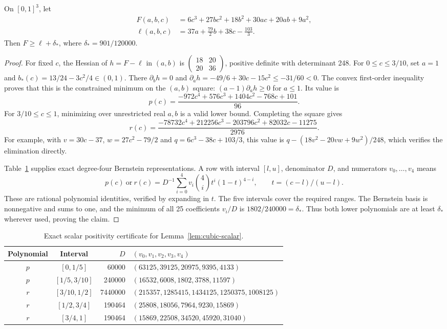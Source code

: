 \begin{lemma}
\label{lem:cubic-scalar}
On $[0,1]^3$, let
\begin{align*}
 F(a,b,c)&=6c^3+27bc^2+18b^2+30ac+20ab+9a^2,\\
 \ell(a,b,c)&=37a+\tfrac{79}{2}b+38c-\tfrac{103}{3}.
\end{align*}
Then $F\ge\ell+\delta_*$, where $\delta_*=901/120000$.
\end{lemma}
\begin{proof}
For fixed $c$, the Hessian of $h=F-\ell$ in $(a,b)$ is
$\left(\begin{smallmatrix}18&20\\20&36\end{smallmatrix}\right)$,
positive definite with determinant 248. For $0\le c\le3/10$, set
$a=1$ and $b_*(c)=13/24-3c^2/4\in(0,1)$. There $\partial_bh=0$ and
$\partial_ah=-49/6+30c-15c^2\le-31/60<0$.
The convex first-order inequality proves that this is the constrained
minimum on the $(a,b)$ square: $(a-1)\partial_ah\ge0$ for $a\le1$.
Its value is
\[
 p(c)=\frac{-972c^4+576c^3+1404c^2-768c+101}{96}.
\]
For $3/10\le c\le1$, minimizing over unrestricted real $a,b$ is a valid
lower bound. Completing the square gives
\[
 r(c)=\frac{-78732c^4+212256c^3-203796c^2+82032c-11275}{2976}.
\]
For example, with $v=30c-37$, $w=27c^2-79/2$ and
$q=6c^3-38c+103/3$, this value is
$q-(18v^2-20vw+9w^2)/248$, which verifies the elimination directly.

Table~\ref{tab:cubic-bernstein} supplies exact degree-four Bernstein
representations. A row with interval $[l,u]$, denominator $D$, and
numerators $v_0,\ldots,v_4$ means
\[
 p(c)\ \text{or}\ r(c)=D^{-1}\sum_{i=0}^4v_i\binom4i
     t^i(1-t)^{4-i},\qquad t=(c-l)/(u-l).
\]
These are rational polynomial identities, verified by expanding in $t$.
The five intervals cover the required ranges. The Bernstein basis is
nonnegative and sums to one, and the minimum of all 25 coefficients
$v_i/D$ is $1802/240000=\delta_*$. Thus both lower polynomials are at
least $\delta_*$ wherever used, proving the claim.
\end{proof}

\begin{table}[htbp]
\centering\small
\begin{tabular}{ccrl}
\toprule
Polynomial&Interval&$D$&$(v_0,v_1,v_2,v_3,v_4)$\\\midrule
$p$&$[0,1/5]$&60000&$(63125,39125,20975,9395,4133)$\\
$p$&$[1/5,3/10]$&240000&$(16532,6008,1802,3788,11597)$\\
$r$&$[3/10,1/2]$&7440000&$(215357,1285415,1434125,1250375,1008125)$\\
$r$&$[1/2,3/4]$&190464&$(25808,18056,7964,9230,15869)$\\
$r$&$[3/4,1]$&190464&$(15869,22508,34520,45920,31040)$\\\bottomrule
\end{tabular}
\caption{Exact scalar positivity certificate for Lemma~\ref{lem:cubic-scalar}.}
\label{tab:cubic-bernstein}
\end{table}

